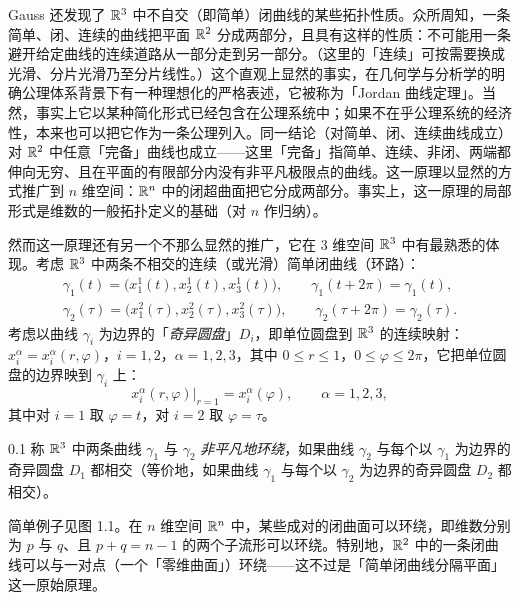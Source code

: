 
Gauss 还发现了 $\mathbb{R}^3$ 中不自交（即简单）闭曲线的某些拓扑性质。众所周知，一条简单、闭、连续的曲线把平面 $\mathbb{R}^2$ 分成两部分，且具有这样的性质：不可能用一条避开给定曲线的连续道路从一部分走到另一部分。（这里的「连续」可按需要换成光滑、分片光滑乃至分片线性。）这个直观上显然的事实，在几何学与分析学的明确公理体系背景下有一种理想化的严格表述，它被称为「Jordan 曲线定理」。当然，事实上它以某种简化形式已经包含在公理系统中；如果不在乎公理系统的经济性，本来也可以把它作为一条公理列入。同一结论（对简单、闭、连续曲线成立）对 $\mathbb{R}^2$ 中任意「完备」曲线也成立——这里「完备」指简单、连续、非闭、两端都伸向无穷、且在平面的有限部分内没有非平凡极限点的曲线。这一原理以显然的方式推广到 $n$ 维空间：$\mathbb{R}^n$ 中的闭超曲面把它分成两部分。事实上，这一原理的局部形式是维数的一般拓扑定义的基础（对 $n$ 作归纳）。

然而这一原理还有另一个不那么显然的推广，它在 $3$ 维空间 $\mathbb{R}^3$ 中有最熟悉的体现。考虑 $\mathbb{R}^3$ 中两条不相交的连续（或光滑）简单闭曲线（环路）：
\begin{gather*}
\gamma_1(t)=\bigl(x_1^1(t),x_2^1(t),x_3^1(t)\bigr),\qquad \gamma_1(t+2\pi)=\gamma_1(t),\\
\gamma_2(\tau)=\bigl(x_1^2(\tau),x_2^2(\tau),x_3^2(\tau)\bigr),\qquad \gamma_2(\tau+2\pi)=\gamma_2(\tau).
\end{gather*}
考虑以曲线 $\gamma_i$ 为边界的「\emph{奇异圆盘}」$D_i$，即单位圆盘到 $\mathbb{R}^3$ 的连续映射：$x_i^\alpha=x_i^\alpha(r,\varphi)$，$i=1,2$，$\alpha=1,2,3$，其中 $0\le r\le 1$，$0\le\varphi\le 2\pi$，它把单位圆盘的边界映到 $\gamma_i$ 上：
\[
x_i^\alpha(r,\varphi)\big|_{r=1}=x_i^\alpha(\varphi),\qquad \alpha=1,2,3,
\]
其中对 $i=1$ 取 $\varphi=t$，对 $i=2$ 取 $\varphi=\tau$。

\begin{definition*}{0.1}
称 $\mathbb{R}^3$ 中两条曲线 $\gamma_1$ 与 $\gamma_2$ \emph{非平凡地环绕}，如果曲线 $\gamma_2$ 与每个以 $\gamma_1$ 为边界的奇异圆盘 $D_1$ 都相交（等价地，如果曲线 $\gamma_1$ 与每个以 $\gamma_2$ 为边界的奇异圆盘 $D_2$ 都相交）。
\end{definition*}

简单例子见图 1.1。在 $n$ 维空间 $\mathbb{R}^n$ 中，某些成对的闭曲面可以环绕，即维数分别为 $p$ 与 $q$、且 $p+q=n-1$ 的两个子流形可以环绕。特别地，$\mathbb{R}^2$ 中的一条闭曲线可以与一对点（一个「零维曲面」）环绕——这不过是「简单闭曲线分隔平面」这一原始原理。

